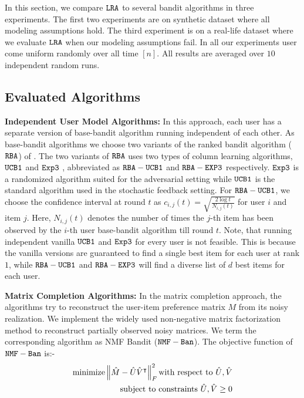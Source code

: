 In this section, we compare ${\tt LRA}$ to several bandit algorithms in three experiments. The first two experiments are on synthetic dataset where all modeling assumptions hold. The third experiment is on a real-life dataset where we evaluate ${\tt LRA}$ when our modeling assumptions fail. In all our experiments user come uniform randomly over all time $[n]$. All results are averaged over $10$ independent random runs.

\subsection{Evaluated Algorithms}
\textbf{Independent User Model Algorithms:} In this approach, each user has a separate version of base-bandit algorithm running independent of each other. As base-bandit algorithms we choose two variants of the ranked bandit algorithm (${\tt RBA}$) of \citet{radlinski2008learning}. The two variants of ${\tt RBA}$ uses two types of column learning algorithms, ${\tt UCB1}$ \citep{auer2002finite} and ${\tt Exp3}$ \citep{auer2002nonstochastic}, abbreviated as ${\tt RBA-UCB1}$ and ${\tt RBA-EXP3}$ respectively. ${\tt Exp3}$ is a randomized algorithm suited for the adversarial setting while ${\tt UCB1}$ is the standard algorithm used in the stochastic feedback setting. For ${\tt RBA-UCB1}$, we choose the confidence interval at round $t$ as $c_{i, j}(t) = \sqrt{\frac{ 2\log t}{N_{i, j}(t)}}$ for user $i$ and item $j$. Here, $N_{i, j}(t)$ denotes the number of times the $j$-th item has been observed by the $i$-th user base-bandit algorithm till round $t$. Note, that running independent vanilla ${\tt UCB1}$ and ${\tt Exp3}$ for every user is not feasible. This is because the vanilla versions are guaranteed to find a single best item for each user at rank $1$, while ${\tt RBA-UCB1}$ and ${\tt RBA-EXP3}$ will find a diverse list of $d$ best items for each user.



\textbf{Matrix Completion Algorithms:} In the matrix completion approach, the algorithms try to reconstruct the user-item preference matrix $M$ from its noisy realization. We implement the widely used non-negative matrix factorization method to reconstruct partially observed noisy matrices. We term the corresponding algorithm as NMF Bandit (${\tt NMF-Ban}$). The objective function of ${\tt NMF-Ban}$ is:-
\begin{align*}
\text{minimize} \left\lVert\hat{M} - \hat{U}\hat{V}^\intercal\right\rVert_{F}^{2} \text{with respect to $\hat{U}, \hat{V}$}\\
\text{ subject to constraints } \hat{U}, \hat{V} \geq 0
\end{align*}

